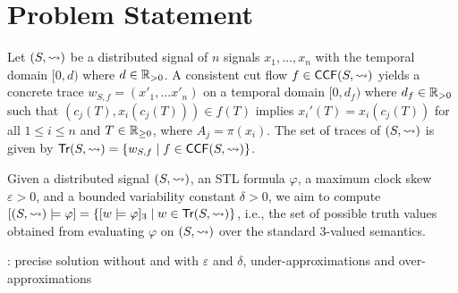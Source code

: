 \section{Problem Statement}
Let $(S,{\rightsquigarrow})$ be a distributed signal of $n$ signals $x_1, \ldots, x_n$ with the temporal domain $[0,d)$ where $d \in \mathbb{R}_{> 0}$.
A consistent cut flow $f \in \mathsf{CCF}(S,{\rightsquigarrow})$ yields a concrete trace $w_{S,f}= (x'_1, \ldots x'_n)$ on a temporal domain $[0,d_f)$ where $d_f \in \mathbb{R}_{> 0}$ such that $(c_j(T), x_i(c_j(T))) \in f(T)$ implies $x_i'(T) = x_i(c_j(T))$ for all $1 \leq i \leq n$ and $T \in \mathbb{R}_{\geq 0}$, where $A_j = \pi(x_i)$.
The set of traces of $(S,{\rightsquigarrow})$ is given by $\tr(S,{\hb}) = \{ w_{S,f} \st f \in \CCF(S,{\hb})\}$.


Given a distributed signal $(S, {\rightsquigarrow})$, an STL formula $\varphi$, a maximum clock skew $\varepsilon > 0$, and a bounded variability constant $\delta > 0$, we aim to compute $[(S, {\hb}) \models \varphi] = \{[w \models \varphi]_3 \st w \in \tr(S, {\hb}) \}$, i.e., the set of possible truth values obtained from evaluating $\varphi$ on $(S, {\rightsquigarrow})$ over the standard 3-valued semantics.

\begin{example}
	\TODO: precise solution without and with $\varepsilon$ and $\delta$, under-approximations and over-approximations
\end{example}